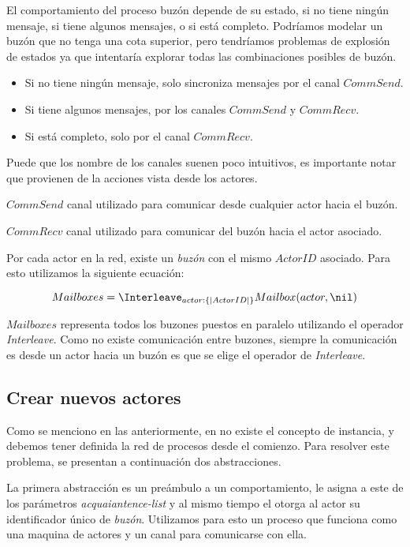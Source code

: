 El comportamiento del proceso buzón depende de su estado, si no tiene ningún mensaje, si tiene algunos mensajes, o si está completo. Podríamos modelar un buzón que no tenga una cota superior, pero tendríamos problemas de explosión de estados ya que \FDR intentaría explorar todas las combinaciones posibles de buzón.

\begin{itemize}
\item Si no tiene ningún mensaje, solo sincroniza mensajes por el canal $CommSend$.
\item Si tiene algunos mensajes, por los canales $CommSend$ y $CommRecv$.
\item Si está completo, solo por el canal $CommRecv$.
\end{itemize}

Puede que los nombre de los canales suenen poco intuitivos, es importante notar que provienen de la acciones vista desde los actores.

\begin{description}
\item $CommSend$ canal utilizado para comunicar desde cualquier actor hacia el buzón.
\item $CommRecv$ canal utilizado para comunicar del buzón hacia el actor asociado.
\end{description}

Por cada actor en la red, existe un \textit{buzón} con el mismo $ActorID$ asociado. Para esto utilizamos la siguiente ecuación:

\[
Mailboxes = \Interleave_{actor : \{| ActorID |\} } Mailbox(actor, \nil) 
\]

$Mailboxes$ representa todos los buzones puestos en paralelo utilizando el operador \textit{Interleave}. Como no existe comunicación entre buzones, siempre la comunicación es desde un actor hacia un buzón es que se elige el operador de \textit{Interleave}.

\subsection{Crear nuevos actores}\label{modelo:crear}

Como se menciono en las anteriormente, en \CSP no existe el concepto de instancia, y debemos tener definida la red de procesos desde el comienzo. Para resolver este problema, se presentan a continuación dos abstracciones.

La primera abstracción es un preámbulo a un comportamiento, le asigna a este de los parámetros \textit{acquaiantence-list} y al mismo tiempo el otorga al actor su identificador único de \textit{buzón}. Utilizamos para esto un proceso que funciona como una maquina de actores y un canal para comunicarse con ella.

